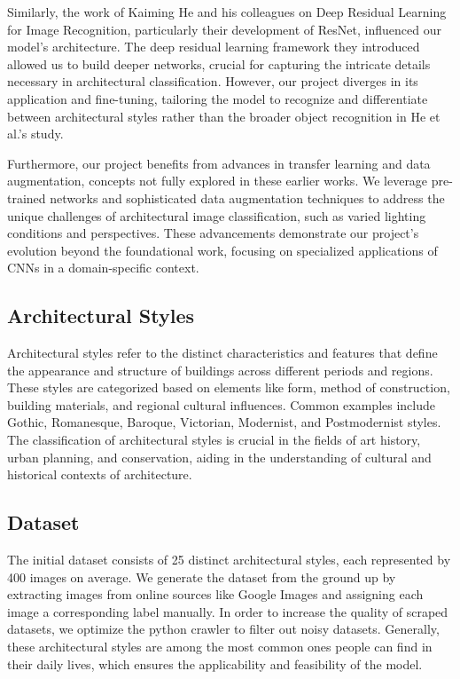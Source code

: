 \documentclass{article}
\begin{document}
Similarly, the work of Kaiming He and his colleagues on Deep Residual Learning for Image Recognition, particularly their development of ResNet, influenced our model's architecture. The deep residual learning framework they introduced allowed us to build deeper networks, crucial for capturing the intricate details necessary in architectural classification. However, our project diverges in its application and fine-tuning, tailoring the model to recognize and differentiate between architectural styles rather than the broader object recognition in He et al.'s study.

Furthermore, our project benefits from advances in transfer learning and data augmentation, concepts not fully explored in these earlier works. We leverage pre-trained networks and sophisticated data augmentation techniques to address the unique challenges of architectural image classification, such as varied lighting conditions and perspectives. These advancements demonstrate our project's evolution beyond the foundational work, focusing on specialized applications of CNNs in a domain-specific context.

\subsection{Architectural Styles}
Architectural styles refer to the distinct characteristics and features that define the appearance and structure of buildings across different periods and regions. These styles are categorized based on elements like form, method of construction, building materials, and regional cultural influences. Common examples include Gothic, Romanesque, Baroque, Victorian, Modernist, and Postmodernist styles. The classification of architectural styles is crucial in the fields of art history, urban planning, and conservation, aiding in the understanding of cultural and historical contexts of architecture.

\subsection{Dataset}
The initial dataset consists of 25 distinct architectural styles, each represented by 400 images on average. We generate the dataset from the ground up by extracting images from online sources like Google Images and assigning each image a corresponding label manually. In order to increase the quality of scraped datasets, we optimize the python crawler to filter out noisy datasets. Generally, these architectural styles are among the most common ones people can find in their daily lives, which ensures the applicability and feasibility of the model.
\end{document}
